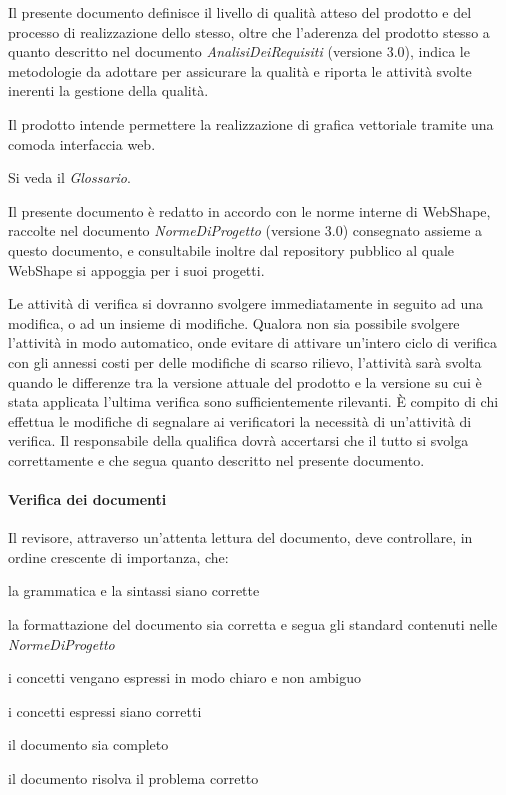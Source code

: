  
\newpage
\thispagestyle{fancy}
\tableofcontents
\thispagestyle{fancy}
\newpage
 
 
Il presente documento definisce il livello di qualit\`a atteso del prodotto e del processo di realizzazione dello stesso, oltre che l'aderenza del prodotto stesso a quanto descritto nel documento \textit{AnalisiDeiRequisiti} (versione 3.0), indica le metodologie da adottare per assicurare la qualit\`a e riporta le attivit\`a svolte inerenti la gestione della qualit\`a.
 
Il prodotto intende permettere la realizzazione di grafica vettoriale tramite una comoda interfaccia web.
 
Si veda il \textit{Glossario}.
 
Il presente documento \`e redatto in accordo con le norme interne di WebShape, raccolte nel documento \textit{NormeDiProgetto} (versione 3.0) consegnato assieme a questo documento, e consultabile inoltre dal repository pubblico al quale WebShape si appoggia per i suoi progetti.
 
 
Le attivit\`a di verifica si dovranno svolgere immediatamente in seguito ad una modifica, o ad un insieme di modifiche. Qualora non sia possibile svolgere l'attivit\`a in modo automatico, onde evitare di attivare un'intero ciclo di verifica con gli annessi costi per delle modifiche di scarso rilievo, l'attivit\`a sar\`a svolta quando le differenze tra la versione attuale del prodotto e la versione su cui \`e stata applicata l'ultima verifica sono sufficientemente rilevanti. \`E compito di chi effettua le modifiche di segnalare ai verificatori la necessit\`a di un'attivit\`a di verifica. Il responsabile della qualifica dovr\`a accertarsi che il tutto si svolga correttamente e che segua quanto descritto nel presente documento.
\paragraph{Verifica dei documenti} Il revisore, attraverso un'attenta lettura del documento, deve controllare, in ordine crescente di importanza, che:
\begin{elenconumerato}[\textbf{}]{\subsubsecindent}
\item la grammatica e la sintassi siano corrette
\item la formattazione del documento sia corretta e segua gli standard contenuti nelle \textit{NormeDiProgetto}
\item i concetti vengano espressi in modo chiaro e non ambiguo
\item i concetti espressi siano corretti
\item il documento sia completo
\item il documento risolva il problema corretto
\end{elenconumerato}

